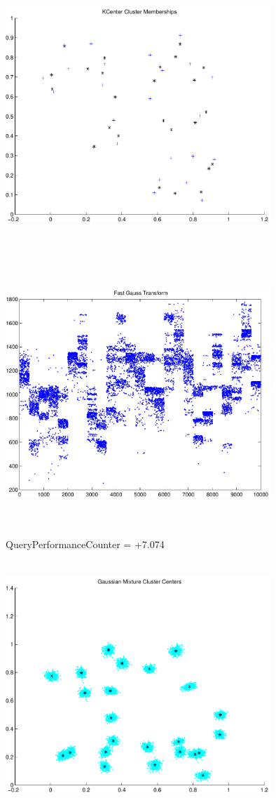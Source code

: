 \documentclass[9pt]{article}
\theoremstyle{plain}
\theoremstyle{definition}
\theoremstyle{remark}
\numberwithin{equation}{section}
\begin{document}
\includegraphics[width=10.0cm,height=10.0cm]{KCenterClusterMemberships_25_Centers.pdf}

\includegraphics[width=10.0cm,height=10.0cm]{FGT25_Centers.pdf}

QueryPerformanceCounter  =  +7.074
\includegraphics[width=10.0cm,height=10.0cm]{GaussianMixture_ClusterCenters24_Centers.pdf}
\end{document}
